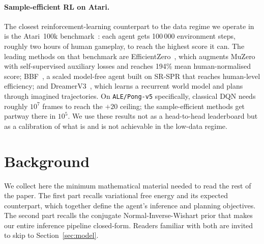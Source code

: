 \documentclass[runningheads]{llncs}
\begin{document}
\paragraph{Sample-efficient RL on Atari.}
The closest reinforcement-learning counterpart to the data regime we
operate in is the Atari~100k benchmark~\cite{ref_atari100k}: each
agent gets 100\,000 environment steps, roughly two hours of human
gameplay, to reach the highest score it can. The leading methods on
that benchmark are EfficientZero~\cite{ref_efficientzero}, which
augments MuZero with self-supervised auxiliary losses and reaches
194\% mean human-normalised score;
BBF~\cite{ref_bbf}, a scaled model-free agent built on SR-SPR that
reaches human-level efficiency; and DreamerV3~\cite{ref_dreamerv3},
which learns a recurrent world model and plans through imagined
trajectories. On \texttt{ALE/Pong-v5} specifically, classical DQN
needs roughly $10^7$ frames to reach the $+20$ ceiling; the
sample-efficient methods get partway there in $10^5$. We use these
results not as a head-to-head leaderboard but as a calibration of
what is and is not achievable in the low-data regime.

\section{Background}\label{sec:background}

We collect here the minimum mathematical material needed to read the
rest of the paper. The first part recalls variational free energy
and its expected counterpart, which together define the agent's
inference and planning objectives. The second part recalls the
conjugate Normal-Inverse-Wishart prior that makes our entire
inference pipeline closed-form. Readers familiar with both are
invited to skip to Section~\ref{sec:model}.
\end{document}
